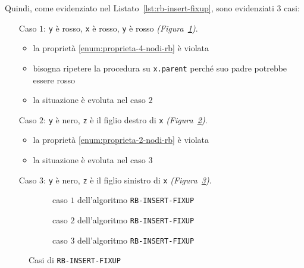 \documentclass[italian, 10pt]{article}
\begin{document}
Quindi, come evidenziato nel Listato~\ref{lst:rb-insert-fixup}, sono evidenziati \(3\) casi:

\begin{itemize}
  \item[Caso \(1\):] \texttt{y} è rosso, \texttt{x} è rosso, \texttt{y} è rosso \textit{(Figura~\ref{fig:caso-1-algoritmo-rb-insert-fixup})}.
    \begin{itemize}
      \item la proprietà \ref{enum:proprieta-4-nodi-rb} è violata
      \item bisogna ripetere la procedura su \texttt{x.parent} perché suo padre potrebbe essere rosso
      \item la situazione è evoluta nel caso \(2\)
    \end{itemize}
  \item[Caso \(2\):] \texttt{y} è nero, \texttt{z} è il figlio destro di \texttt{x} \textit{(Figura~\ref{fig:caso-2-algoritmo-rb-insert-fixup})}.
    \begin{itemize}
      \item la proprietà \ref{enum:proprieta-2-nodi-rb} è violata
      \item la situazione è evoluta nel caso \(3\)
    \end{itemize}
  \item[Caso \(3\):] \texttt{y} è nero, \texttt{z} è il figlio sinistro di \texttt{x} \textit{(Figura~\ref{fig:caso-3-algoritmo-rb-insert-fixup})}.
\end{itemize}

\begin{figure}[htbp]
  \begin{subfigure}{0.99\textwidth}
    \centering
    \bigskip
    \caption{caso \(1\) dell'algoritmo \texttt{RB-INSERT-FIXUP}}
    \label{fig:caso-1-algoritmo-rb-insert-fixup}
    \bigskip
  \end{subfigure}
  \begin{subfigure}{0.99\textwidth}
    \centering
    \bigskip
    \caption{caso \(2\) dell'algoritmo \texttt{RB-INSERT-FIXUP}}
    \label{fig:caso-2-algoritmo-rb-insert-fixup}
    \bigskip
  \end{subfigure}
  \begin{subfigure}{0.99\textwidth}
    \centering
    \bigskip
    \caption{caso \(3\) dell'algoritmo \texttt{RB-INSERT-FIXUP}}
    \label{fig:caso-3-algoritmo-rb-insert-fixup}
    \bigskip
  \end{subfigure}
  \caption{Casi di \texttt{RB-INSERT-FIXUP}}
  \label{fig:casi-algoritmo-rb-insert-fixup}
\end{figure}
\end{document}
